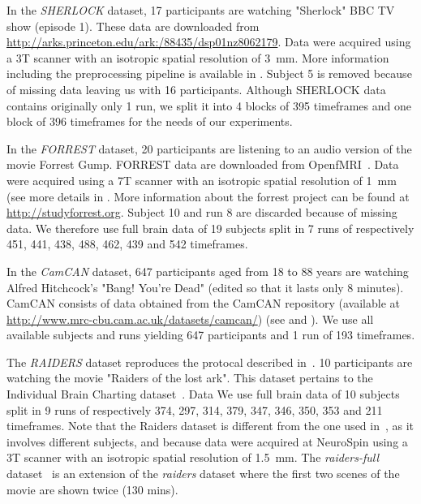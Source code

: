 In the \emph{SHERLOCK} dataset, 17 participants are watching "Sherlock" BBC TV show (episode 1). 
% 
These data are downloaded from \url{http://arks.princeton.edu/ark:/88435/dsp01nz8062179}. 
% 
Data were acquired using a 3T scanner with an isotropic spatial resolution of 3 mm. 
% 
More information including the preprocessing pipeline is available in \cite{sherlock}.
% 
Subject 5 is removed because of missing data leaving us with 16 participants.
% 
Although SHERLOCK data contains originally only 1 run, we split it into 4 blocks of 395 timeframes and one block of 396 timeframes for the needs of our experiments. 

In the \emph{FORREST} dataset, 20 participants are listening to an audio version of the movie Forrest Gump.
% 
FORREST data are downloaded from OpenfMRI~\cite{poldrack2013toward}. 
% 
Data were acquired using a 7T scanner with an isotropic spatial resolution of 1 mm (see more details in \cite{hanke2014high}.
% 
More information about the forrest project can be found at \url{http://studyforrest.org}.
% 
Subject 10 and run 8 are discarded because of missing data.
% 
We therefore use full brain data of 19 subjects split in 7 runs of respectively 451, 441, 438, 488, 462, 439 and 542 timeframes.


In the \emph{CamCAN} dataset, 647 participants aged from 18 to 88 years are watching Alfred Hitchcock's "Bang! You're Dead" (edited so that it lasts only 8 minutes).
% 
CamCAN consists of data obtained from the CamCAN repository (available at \url{http://www.mrc-cbu.cam.ac.uk/datasets/camcan/}) (see \cite{taylor2017cambridge} and \cite{shafto2014cambridge}).
% 
We use all available subjects and runs yielding 647 participants and 1 run of 193 timeframes.


The \emph{RAIDERS} dataset reproduces the protocal described
in~\cite{haxby2011common}. 10 participants are watching the movie "Raiders
of the lost ark". This dataset pertains to the Individual Brain Charting
dataset~\cite{ibc}.
% 
Data 
% 
We use full brain data of 10 subjects split in 9 runs of respectively 374, 297, 314, 379, 347, 346, 350, 353 and 211 timeframes.
%
Note that the Raiders dataset is different from the one used in~\cite{chen2015reduced}, as it involves different subjects, and because data were acquired at NeuroSpin using a 3T scanner with an isotropic spatial resolution of 1.5 mm.
The \emph{raiders-full} dataset~\cite{ibc} is an extension of the \emph{raiders} dataset where the first two scenes of the movie are shown twice (130 mins).

